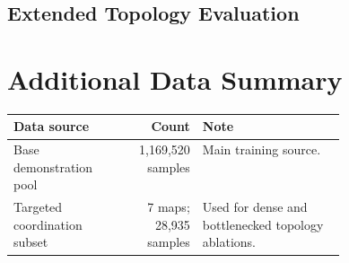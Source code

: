 \documentclass[conference]{IEEEtran}
\begin{document}
\noindent\resizebox{\columnwidth}{!}{}

\vspace{0.65em}
\subsection{Extended Topology Evaluation}
\label{tab:appendix-extended-per-map}
\vspace{0.25em}

\noindent\resizebox{\columnwidth}{!}{}

\section{Additional Data Summary}
\vspace{0.35em}

\label{tab:appendix-data-summary}
\vspace{0.25em}

\noindent\scriptsize
\setlength{\tabcolsep}{3pt}
\begin{tabular}{lrp{0.43\linewidth}}
\toprule
Data source & Count & Note \\
\midrule
Base demonstration pool & 1,169,520 samples & Main training source. \\
Targeted coordination subset & 7 maps; 28,935 samples & Used for dense and bottlenecked topology ablations. \\
\bottomrule
\end{tabular}
\normalsize

\balance


\end{document}
